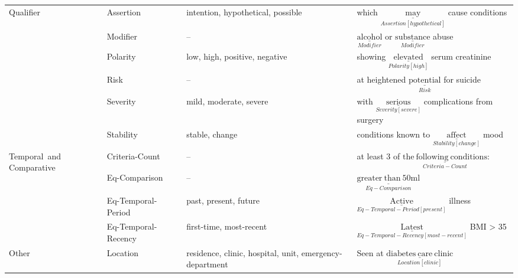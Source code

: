 \begin{tabular}{m{2cm} m{2.5cm} m{4.9cm} m{6.5cm}}
    \hline
    
    \multirow{6}{}[-16pt]{\mbox{Qualifier}} &
        Assertion
            & intention, hypothetical, possible
            & which $\underset{Assertion[hypothetical]}{\underline{\mathrm{may}}}$ cause conditions \\
         & Modifier
            & --
            & $\underset{Modifier}{\underline{\mathrm{alcohol}}}$ or $\underset{Modifier}{\underline{\mathrm{substance}}}$ abuse  \\
         & Polarity 
                & low, high, positive, negative 
                & showing $\underset{Polarity[high]}{\underline{\mathrm{elevated}}}$ serum creatinine  \\
         & Risk
            & -- 
            & at heightened $\underset{Risk}{\underline{\mathrm{potential}}}$ for suicide \\
         & Severity 
            & mild, moderate, severe 
            & with $\underset{Severity[severe]}{\underline{\mathrm{serious}}}$ complications from surgery  \\
         & Stability 
                & stable, change 
                & conditions known to $\underset{Stability[change]}{\underline{\mathrm{affect}}}$ mood \\[2ex]
    \hline
    \multirow{4}{}[-17pt]{\mbox{Temporal and} Comparative} &
        Criteria-Count
            & --
            & at least 3 of $\underset{Criteria-Count}{\underline{\mathrm{the\ following\ conditions}}}$: \\
     & Eq-Comparison
            & --
            & $\underset{Eq-Comparison}{\underline{\mathrm{greater\ than\ 50ml}}}$ \\
     
     & Eq-Temporal-Period
            & past, present, future
            & $\underset{Eq-Temporal-Period[present]}{\underline{\mathrm{Active}}}$ illness \\
     & Eq-Temporal-Recency
            & first-time, most-recent
            & $\underset{Eq-Temporal-Recency[most-recent]}{\underline{\mathrm{Latest}}}$ BMI > 35 \\
            
    \hline   
    Other &
       Location 
            & residence, clinic, hospital, unit, emergency-department  
            & Seen at $\underset{Location[clinic]}{\underline{\mathrm{diabetes\ care\ clinic}}}$ \\[2ex]
    
\end{tabular}
